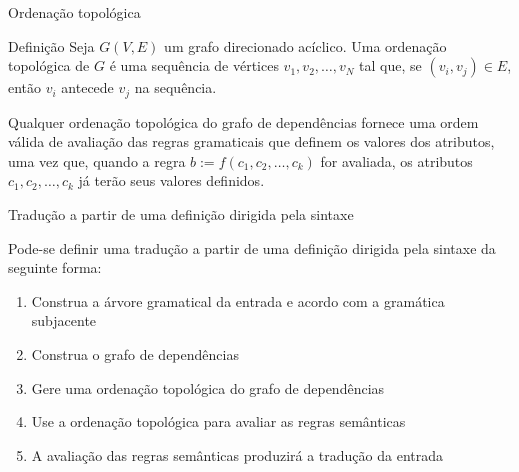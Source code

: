 \begin{frame}[fragile]{Ordenação topológica}

    \begin{block}{Definição}
        Seja $G(V, E)$ um grafo direcionado acíclico. Uma ordenação topológica de $G$ é uma sequência de vértices $v_1, v_2, \ldots, v_N$ tal que, se 
            $(v_i, v_j)\in E$, então $v_i$ antecede $v_j$ na sequência.
    \end{block}

    \vspace{0.2in}
    \pause

    Qualquer ordenação topológica do grafo de dependências fornece uma ordem válida de avaliação das regras gramaticais que definem os valores dos atributos, uma
        vez que, quando a regra $b := f(c_1, c_2, \ldots, c_k)$ for avaliada, os atributos $c_1, c_2, \ldots, c_k$ já terão seus valores definidos.
\end{frame}

\begin{frame}[fragile]{Tradução a partir de uma definição dirigida pela sintaxe}

    Pode-se definir uma tradução a partir de uma definição dirigida pela sintaxe da seguinte forma:
    \pause

    \vspace{0.2in}

    \begin{enumerate}
        \item Construa a árvore gramatical da entrada e acordo com a gramática subjacente
        \pause

        \item Construa o grafo de dependências
        \pause

        \item Gere uma ordenação topológica do grafo de dependências
        \pause

        \item Use a ordenação topológica para avaliar as regras semânticas
        \pause

        \item A avaliação das regras semânticas produzirá a tradução da entrada
    \end{enumerate}

\end{frame}
